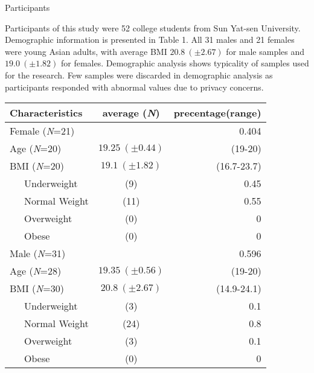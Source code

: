 \documentclass[final]{beamer}
\newlength{\onecolwid}
\newlength{\twocolwid}
\begin{document}
\begin{frame}[t]
\begin{columns}[t]
\begin{column}{\twocolwid} %

\begin{columns}[t,totalwidth=\twocolwid] %

\begin{column}{\onecolwid}\vspace{-.6in} %


\begin{block}{Participants}

Participants of this study were 52 college students from Sun Yat-sen University.
Demographic information is presented in Table 1. All 31 males and 21 females
were young Asian adults, with average BMI \(20.8~(\pm 2.67)\) for male samples and \(19.0~(\pm 1.82)\) for females.
Demographic analysis shows typicality of samples used for the research.
Few samples were discarded in demographic analysis as participants responded with abnormal values due to privacy concerns.
\renewcommand\tablename{\textbf{Table}}
\begin{table}[htbp]
    \centering
    \begin{tabular}{lcr} 
        \toprule
        Characteristics & average (\textit{N}) & precentage(range) \\
        \midrule
        Female (\textit{N}=21) &  & 0.404 \\ 
        Age (\textit{N}=20) & \(19.25~(\pm 0.44)\) & (19-20)\\ 
        BMI (\textit{N}=20) & \(19.1~(\pm 1.82)\) & (16.7-23.7) \\
        ~~~Underweight & (9) & 0.45 \\
        ~~~Normal Weight & (11) & 0.55 \\
        ~~~Overweight & (0) & 0 \\
        ~~~Obese & (0) & 0 \\
        \midrule
        Male (\textit{N}=31) &  & 0.596 \\ 
        Age (\textit{N}=28) & \(19.35~(\pm 0.56)\) & (19-20)\\ 
        BMI (\textit{N}=30) & \(20.8~(\pm 2.67)\) & (14.9-24.1)\\ 
        ~~~Underweight & (3) & 0.1 \\
        ~~~Normal Weight & (24) & 0.8 \\
        ~~~Overweight & (3) & 0.1 \\
        ~~~Obese & (0) & 0 \\
        \bottomrule
    \end{tabular}
\end{table}


\end{block}
\end{column}
\end{columns}
\end{column}
\end{columns}
\end{frame}
\end{document}
